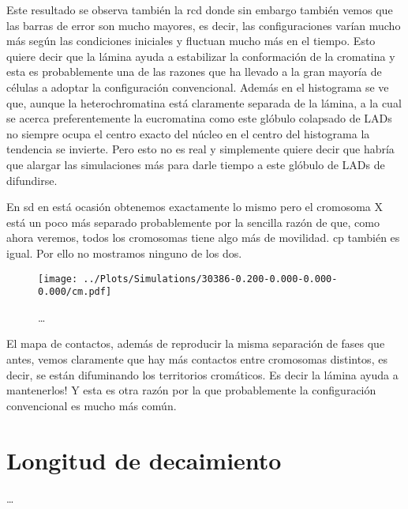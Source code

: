 Este resultado se observa también la rcd donde sin embargo también vemos que las barras de error son mucho mayores, es decir, las configuraciones varían mucho más según las condiciones iniciales y fluctuan mucho más en el tiempo. Esto quiere decir que la lámina ayuda a estabilizar la conformación de la cromatina y esta es probablemente una de las razones que ha llevado a la gran mayoría de células a adoptar la configuración convencional. Además en el histograma se ve que, aunque la heterochromatina está claramente separada de la lámina, a la cual se acerca preferentemente la eucromatina como este glóbulo colapsado de LADs no siempre ocupa el centro exacto del núcleo en el centro del histograma la tendencia se invierte. Pero esto no es real y simplemente quiere decir que habría que alargar las simulaciones más para darle tiempo a este glóbulo de LADs de difundirse.

En sd en está ocasión obtenemos exactamente lo mismo pero el cromosoma X está un poco más separado probablemente por la sencilla razón de que, como ahora veremos, todos los cromosomas tiene algo más de movilidad. cp también es igual. Por ello no mostramos ninguno de los dos.

\begin{figure}
    \centering
    \texttt{[image: ../Plots/Simulations/30386-0.200-0.000-0.000-0.000/cm.pdf]}
    \caption{\dots}
    \label{fig:cm_i}
\end{figure}

El mapa de contactos, además de reproducir la misma separación de fases que antes, vemos claramente que hay más contactos entre cromosomas distintos, es decir, se están difuminando los territorios cromáticos. Es decir la lámina ayuda a mantenerlos! Y esta es otra razón por la que probablemente la configuración convencional es mucho más común.

\section{Longitud de decaimiento}

\dots
